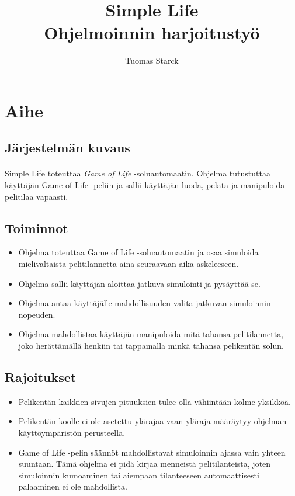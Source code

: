 \documentclass[11pt]{article}
\begin{document}
\title{\LARGE{\bf Simple Life} \\ \Large{Ohjelmoinnin harjoitustyö}}
\author{Tuomas Starck}
\maketitle

\vspace{4em}

\section{Aihe}

\subsection{Järjestelmän kuvaus}

\paragraph{} Simple Life toteuttaa \textit{Game of Life} -soluautomaatin. Ohjelma tutustuttaa käyttäjän Game of Life -peliin ja sallii käyttäjän luoda, pelata ja manipuloida pelitilaa vapaasti.

\subsection{Toiminnot}

\begin{itemize}
\item Ohjelma toteuttaa Game of Life -soluautomaatin ja osaa simuloida mielivaltaista pelitilannetta aina seuraavaan aika-askeleeseen.
\item Ohjelma sallii käyttäjän aloittaa jatkuva simulointi ja pysäyttää se.
\item Ohjelma antaa käyttäjälle mahdollisuuden valita jatkuvan simuloinnin nopeuden.
\item Ohjelma mahdollistaa käyttäjän manipuloida mitä tahansa pelitilannetta, joko herättämällä henkiin tai tappamalla minkä tahansa pelikentän solun.
\end{itemize}

\subsection{Rajoitukset}

\begin{itemize}
\item Pelikentän kaikkien sivujen pituuksien tulee olla vähiintään kolme yksikköä.
\item Pelikentän koolle ei ole asetettu ylärajaa vaan yläraja määräytyy ohjelman käyttöympäristön perusteella.
\item Game of Life -pelin säännöt mahdollistavat simuloinnin ajassa vain yhteen suuntaan. Tämä ohjelma ei pidä kirjaa menneistä pelitilanteista, joten simuloinnin kumoaminen tai aiempaan tilanteeseen automaattisesti palaaminen ei ole mahdollista.
\end{itemize}
\end{document}
